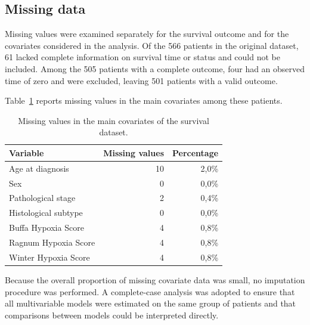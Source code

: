 \documentclass[12pt,a4paper]{article}
\begin{document}
\subsection{Missing data}

Missing values were examined separately for the survival outcome and for the covariates considered in the analysis. Of the 566 patients in the original dataset, 61 lacked complete information on survival time or status and could not be included. Among the 505 patients with a complete outcome, four had an observed time of zero and were excluded, leaving 501 patients with a valid outcome.

Table~\ref{tab:dati_mancanti} reports missing values in the main covariates among these patients.

\begin{table}[H]
\centering
\caption{Missing values in the main covariates of the survival dataset.}
\label{tab:dati_mancanti}

\renewcommand{\arraystretch}{1.2}
\setlength{\tabcolsep}{10pt}

\begin{tabular}{l r r}
\toprule
\textbf{Variable} &
\textbf{Missing values} &
\textbf{Percentage} \\
\midrule

Age at diagnosis
& 10
& 2,0\% \\

Sex
& 0
& 0,0\% \\

Pathological stage
& 2
& 0,4\% \\

Histological subtype
& 0
& 0,0\% \\

Buffa Hypoxia Score
& 4
& 0,8\% \\

Ragnum Hypoxia Score
& 4
& 0,8\% \\

Winter Hypoxia Score
& 4
& 0,8\% \\

\bottomrule
\end{tabular}
\end{table}

Because the overall proportion of missing covariate data was small, no imputation procedure was performed. A complete-case analysis was adopted to ensure that all multivariable models were estimated on the same group of patients and that comparisons between models could be interpreted directly.
\end{document}
